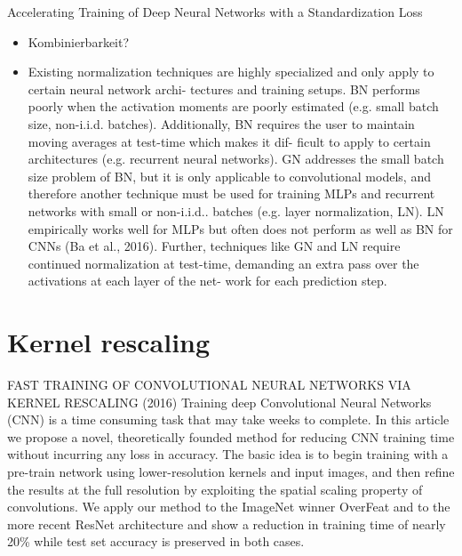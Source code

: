 \documentclass[10pt]{beamer}
\begin{document}
\begin{frame}{Accelerating Training of Deep Neural Networks with a Standardization Loss}
 \begin{itemize}
  \item Kombinierbarkeit?
  \item Existing normalization techniques are highly
specialized and only apply to certain neural network archi-
tectures and training setups. BN performs poorly when the activation moments are poorly estimated (e.g. small batch
size, non-i.i.d. batches). Additionally, BN requires the user
to maintain moving averages at test-time which makes it dif-
ficult to apply to certain architectures (e.g. recurrent neural
networks). GN addresses the small batch size problem of
BN, but it is only applicable to convolutional models, and
therefore another technique must be used for training MLPs
and recurrent networks with small or non-i.i.d.. batches
(e.g. layer normalization, LN). LN empirically works well
for MLPs but often does not perform as well as BN for
CNNs (Ba et al., 2016). Further, techniques like GN and
LN require continued normalization at test-time, demanding
an extra pass over the activations at each layer of the net-
work for each prediction step.
 \end{itemize}

\end{frame}



\section{Kernel rescaling}

\begin{frame}{FAST TRAINING OF CONVOLUTIONAL
NEURAL NETWORKS VIA KERNEL RESCALING (2016)}
Training deep Convolutional Neural Networks (CNN) is a time consuming task that may take weeks to complete. In this article we propose a novel, theoretically founded method for reducing CNN training time without incurring any loss in accuracy. The basic idea is to begin training with a pre-train network using lower-resolution kernels and input images, and then refine the results at the full resolution by exploiting the spatial scaling property of convolutions. We apply our method to the ImageNet winner OverFeat and to the more recent ResNet architecture and show a reduction in training time of nearly 20\% while test set accuracy is preserved in both cases.
\end{frame}
\end{document}
